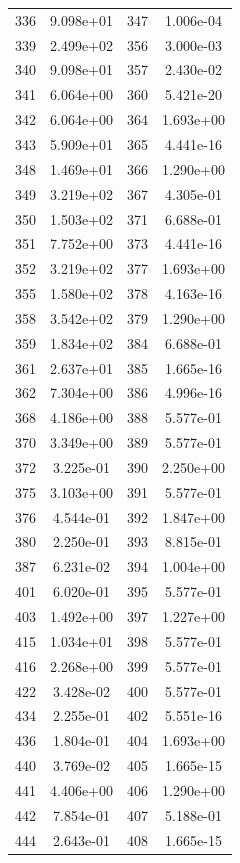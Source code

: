 \documentclass[12pt]{article}
\begin{document}
\begin{longtable}{@{}cccc@{}}
336 & 9.098e+01 & 347 & 1.006e-04 \\
339 & 2.499e+02 & 356 & 3.000e-03 \\
340 & 9.098e+01 & 357 & 2.430e-02 \\
341 & 6.064e+00 & 360 & 5.421e-20 \\
342 & 6.064e+00 & 364 & 1.693e+00 \\
343 & 5.909e+01 & 365 & 4.441e-16 \\
348 & 1.469e+01 & 366 & 1.290e+00 \\
349 & 3.219e+02 & 367 & 4.305e-01 \\
350 & 1.503e+02 & 371 & 6.688e-01 \\
351 & 7.752e+00 & 373 & 4.441e-16 \\
352 & 3.219e+02 & 377 & 1.693e+00 \\
355 & 1.580e+02 & 378 & 4.163e-16 \\
358 & 3.542e+02 & 379 & 1.290e+00 \\
359 & 1.834e+02 & 384 & 6.688e-01 \\
361 & 2.637e+01 & 385 & 1.665e-16 \\
362 & 7.304e+00 & 386 & 4.996e-16 \\
368 & 4.186e+00 & 388 & 5.577e-01 \\
370 & 3.349e+00 & 389 & 5.577e-01 \\
372 & 3.225e-01 & 390 & 2.250e+00 \\
375 & 3.103e+00 & 391 & 5.577e-01 \\
376 & 4.544e-01 & 392 & 1.847e+00 \\
380 & 2.250e-01 & 393 & 8.815e-01 \\
387 & 6.231e-02 & 394 & 1.004e+00 \\
401 & 6.020e-01 & 395 & 5.577e-01 \\
403 & 1.492e+00 & 397 & 1.227e+00 \\
415 & 1.034e+01 & 398 & 5.577e-01 \\
416 & 2.268e+00 & 399 & 5.577e-01 \\
422 & 3.428e-02 & 400 & 5.577e-01 \\
434 & 2.255e-01 & 402 & 5.551e-16 \\
436 & 1.804e-01 & 404 & 1.693e+00 \\
440 & 3.769e-02 & 405 & 1.665e-15 \\
441 & 4.406e+00 & 406 & 1.290e+00 \\
442 & 7.854e-01 & 407 & 5.188e-01 \\
444 & 2.643e-01 & 408 & 1.665e-15 \\

\end{longtable}
\end{document}
